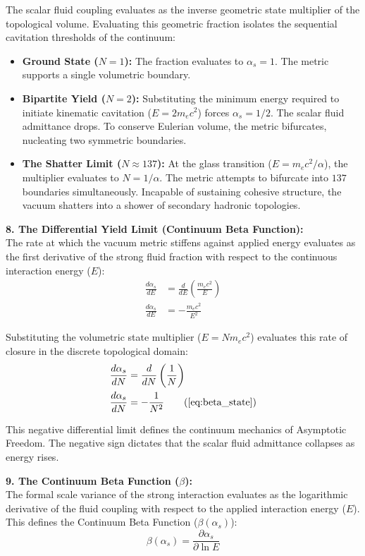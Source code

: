 \documentclass[11pt, a4paper]{article}
\begin{document}
The scalar fluid coupling evaluates as the inverse geometric state multiplier of the topological volume. Evaluating this geometric fraction isolates the sequential cavitation thresholds of the continuum:
\begin{itemize}
    \item \textbf{Ground State ($N=1$):} The fraction evaluates to $\alpha_s = 1$. The metric supports a single volumetric boundary.
    \item \textbf{Bipartite Yield ($N=2$):} Substituting the minimum energy required to initiate kinematic cavitation ($E = 2m_e c^2$) forces $\alpha_s = 1/2$. The scalar fluid admittance drops. To conserve Eulerian volume, the metric bifurcates, nucleating two symmetric boundaries.
    \item \textbf{The Shatter Limit ($N \approx 137$):} At the glass transition ($E = m_e c^2 / \alpha$), the multiplier evaluates to $N = 1/\alpha$. The metric attempts to bifurcate into $137$ boundaries simultaneously. Incapable of sustaining cohesive structure, the vacuum shatters into a shower of secondary hadronic topologies.
\end{itemize}

\textbf{8. The Differential Yield Limit (Continuum Beta Function):} \\
The rate at which the vacuum metric stiffens against applied energy evaluates as the first derivative of the strong fluid fraction with respect to the continuous interaction energy ($E$):
\begin{align}
    \frac{d\alpha_s}{dE} &= \frac{d}{dE} \left( \frac{m_e c^2}{E} \right) \\
    \frac{d\alpha_s}{dE} &= - \frac{m_e c^2}{E^2}
\end{align}

Substituting the volumetric state multiplier ($E = N m_e c^2$) evaluates this rate of closure in the discrete topological domain:
\begin{align}
    \frac{d\alpha_s}{dN} &= \frac{d}{dN} \left( \frac{1}{N} \right) \\
    \frac{d\alpha_s}{dN} &= - \frac{1}{N^2} \tag{\ref{eq:beta_state}}
\end{align}

This negative differential limit defines the continuum mechanics of Asymptotic Freedom. The negative sign dictates that the scalar fluid admittance collapses as energy rises. 

\textbf{9. The Continuum Beta Function ($\beta$):} \\
The formal scale variance of the strong interaction evaluates as the logarithmic derivative of the fluid coupling with respect to the applied interaction energy ($E$). This defines the Continuum Beta Function ($\beta(\alpha_s)$):
\begin{equation}
    \beta(\alpha_s) = \frac{\partial \alpha_s}{\partial \ln E}
\end{equation}
\end{document}
